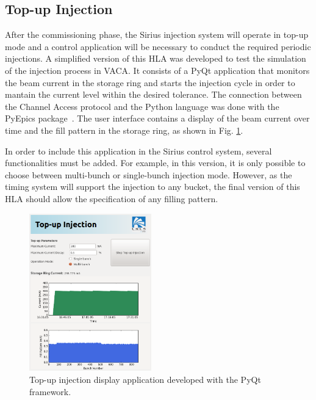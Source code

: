 \subsection{Top-up Injection}

After the commissioning phase, the Sirius injection system will operate in top-up mode and a control application will be necessary to conduct the required periodic injections. A simplified version of this HLA was developed to test the simulation of the injection process in VACA. It consists of a PyQt application that monitors the beam current in the storage ring and starts the injection cycle in order to mantain the current level within the desired tolerance. The connection between the Channel Access protocol and the Python language was done with the PyEpics package~\cite{pyepics}. The user interface contains a display of the beam current over time and the fill pattern in the storage ring, as shown in Fig. \ref{fig:topup}.

In order to include this application in the Sirius control system, several functionalities must be added. For example, in this version, it is only possible to 
choose between multi-bunch or single-bunch injection mode. However, as the timing system will support the injection to any bucket, the final version of this HLA should allow the specification of any filling pattern.


\begin{figure}[!htb]
   \centering
   \includegraphics*[width=150pt]{WEPOPRPO22f4}
   \caption{Top-up injection display application developed with the PyQt framework.}
   \label{fig:topup}
\end{figure}

